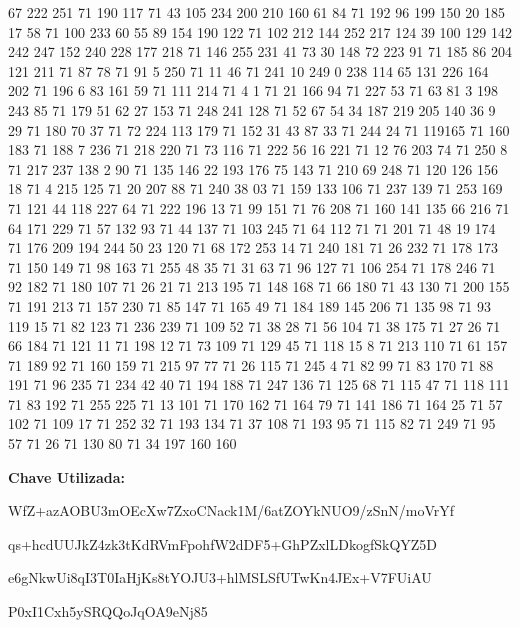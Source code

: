 \begin{apendicesenv}
67 222 251 71 190 117 71 43 105 234 200 210 160 61 84 71 192 96 199 150 20 185 17 58 71 100 233 60 55 89 154 190 122 71 102 212 144 252 217 124 39 100 129 142 242 247 152 240 228 177 218 71 146 255 231 41 73 30 148 72 223 91 71 185 86 204 121 211 71 87 78 71 91 5 250 71 11 46 71 241 10 249 0 238 114 65 131 226 164 202 71 196 6 83 161 59 71 111 214 71 4 1 71 21 166 94 71 227 53 71 63 81 3 198 243 85 71 179 51 62 27 153 71 248 241 128 71 52 67 54 34 187 219 205 140 36 9 29 71 180 70 37 71 72 224 113 179 71 152 31 43 87 33 71 244 24 71 119165 71 160 183 71 188 7 236 71 218 220 71 73 116 71 222 56 16 221 71 12 76 203 74 71 250 8 71 217 237 138 2 90 71 135 146 22 193 176 75 143 71 210 69 248 71 120 126 156 18 71 4 215 125 71 20 207 88 71 240 38 03 71 159 133 106 71 237 139 71 253 169 71 121 44 118 227 64 71 222 196 13 71 99 151 71 76 208 71 160 141 135 66 216 71 64 171 229 71 57 132 93 71 44 137 71 103 245 71 64 112 71 71 201 71 48 19 174 71 176 209 194 244 50 23 120 71 68 172 253 14 71 240 181 71 26 232 71 178 173 71 150 149 71 98 163 71 255 48 35 71 31 63 71 96 127 71 106 254 71 178 246 71 92 182 71 180 107 71 26 21 71 213 195 71 148 168 71 66 180 71 43 130 71 200 155 71 191 213 71 157 230 71 85 147 71 165 49 71 184 189 145 206 71 135 98 71 93 119 15 71 82 123 71 236 239 71 109 52 71 38 28 71 56 104 71 38 175 71 27 26 71 66 184 71 121 11 71 198 12 71 73 109 71 129 45 71 118 15 8 71 213 110 71 61 157 71 189 92 71 160 159 71 215 97 77 71 26 115 71 245 4 71 82 99 71 83 170 71 88 191 71 96 235 71 234 42 40 71 194 188 71 247 136 71 125 68 71 115 47 71 118 111 71 83 192 71 255 225 71 13 101 71 170 162 71 164 79 71 141 186 71 164 25 71 57 102 71 109 17 71 252 32 71 193 134 71 37 108 71 193 95 71 115 82 71 249 71 95 57 71 26 71 130 80 71 34 197 160 160 

\textbf{Chave Utilizada:}

WfZ+azAOBU3mOEcXw7ZxoCNack1M/6atZOYkNUO9/zSnN/moVrYf

qs+hcdUUJkZ4zk3tKdRVmFpohfW2dDF5+GhPZxlLDkogfSkQYZ5D

e6gNkwUi8qI3T0IaHjKs8tYOJU3+hlMSLSfUTwKn4JEx+V7FUiAU

P0xI1Cxh5ySRQQoJqOA9eNj85                                              



\end{apendicesenv}


